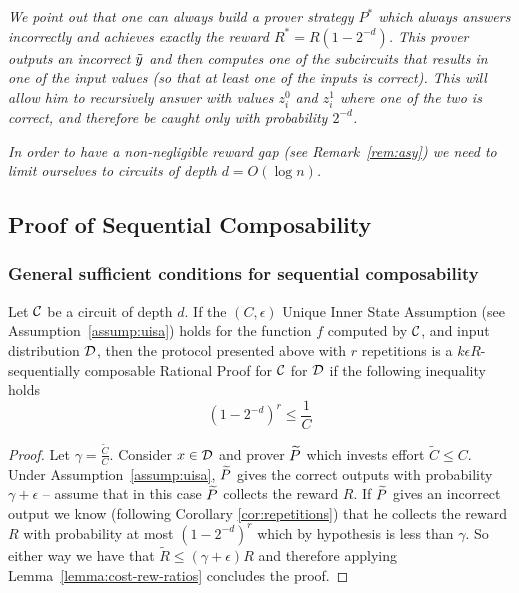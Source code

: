 \begin{remark}
\label{rem:match}
{\em 
We point out that one can always build a prover strategy 
$P^*$ which always answers incorrectly and achieves exactly the reward 
$R^*=R(1-2^{-d})$. This prover outputs an incorrect 
$\tilde{y}$ and then computes one of the subcircuits that results in one of the input values (so that at least one of the inputs is correct). This will allow him to recursively answer with values $z^0_i$ and $z^1_i$ where one of the two is correct, and therefore be caught only with probability $2^{-d}$.
}
\end{remark}

\begin{remark}
\label{rem:logd}
{\em 
In order to have a non-negligible reward gap (see Remark~\ref{rem:asy}) we need
to limit ourselves to circuits of depth $d=O(\log n)$. 
}
\end{remark}

\subsection{Proof of Sequential Composability}
\label{sec:proof-comp}

\subsubsection{General sufficient conditions for sequential composability}

\begin{lemma}
	Let $\cal{C}$ be a circuit of depth $d$. If the $(C,\epsilon)$ Unique Inner State Assumption (see Assumption~\ref{assump:uisa}) holds for the function $f$ computed by $\cal C$, and input distribution $\cal D$, then the protocol presented above with $r$ repetitions is a $k\epsilon R$-sequentially composable Rational Proof for $\cal{C}$ for $\cal D$ if the following inequality holds 
	$$ (1-2^{-d})^r \leq \frac{1}{C} $$
\end{lemma}
\begin{proof}
	Let $\gamma=\frac{\tilde{C}}{C}$. 
Consider $x \in \cal D$ and prover $\widetilde{P}$ which invests effort $\tilde{C}\leq C$. Under Assumption~\ref{assump:uisa}, $\widetilde{P}$ gives the correct outputs
with probability $\gamma+\epsilon$ -- assume that in this case $\widetilde{P}$ collects the reward $R$. If $\widetilde{P}$ gives an incorrect output we know (following Corollary \ref{cor:repetitions}) that he collects the reward 
$R$ with probability at most $(1-2^{-d})^r$ which by hypothesis is less than $\gamma$. So either way we have that $\tilde{R} \leq (\gamma + \epsilon)R$ 
and therefore applying Lemma~\ref{lemma:cost-rew-ratios} concludes the proof.
\end{proof}

